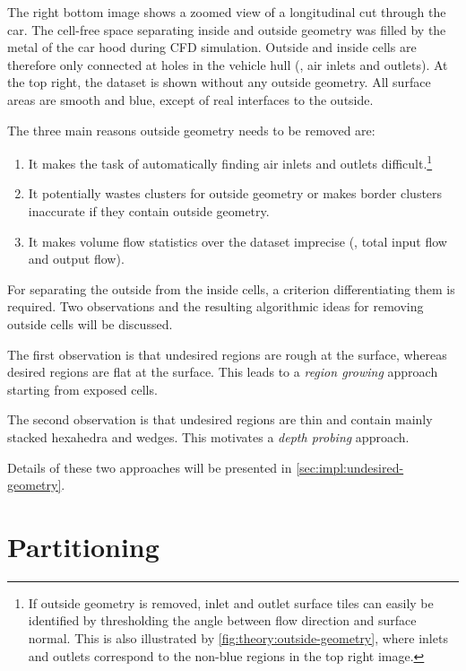 The right bottom image shows a zoomed view of a longitudinal cut through the car. The cell-free space separating inside and outside geometry was filled by the metal of the car hood during \ac{CFD} simulation. Outside and inside cells are therefore only connected at holes in the vehicle hull (\ie, air inlets and outlets). At the top right, the dataset is shown without any outside geometry. All surface areas are smooth and blue, except of real interfaces to the outside.

The three main reasons outside geometry needs to be removed are:
\begin{enumerate}
  \item It makes the task of automatically finding air inlets and outlets difficult.\footnote{If outside geometry is removed, inlet and outlet surface tiles can easily be identified by thresholding the angle between flow direction and surface normal. This is also illustrated by \autoref{fig:theory:outside-geometry}, where inlets and outlets correspond to the non-blue regions in the top right image.}
  
  \item It potentially wastes clusters for outside geometry or makes border clusters inaccurate if they contain outside geometry.
  
  \item It makes volume flow statistics over the dataset imprecise (\eg, total input flow and output flow).
\end{enumerate}

For separating the outside from the inside cells, a criterion differentiating them is required. Two observations and the resulting algorithmic ideas for removing outside cells will be discussed.

The first observation is that undesired regions are rough at the surface, whereas desired regions are flat at the surface. This leads to a \emph{region growing} approach starting from exposed cells.

The second observation is that undesired regions are thin and contain mainly stacked hexahedra and wedges. This motivates a \emph{depth probing} approach.

Details of these two approaches will be presented in \autoref{sec:impl:undesired-geometry}.


\section{Partitioning}
\label{sec:theory:partitioning}

